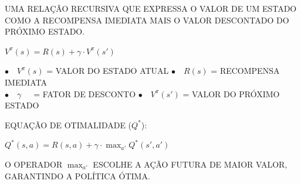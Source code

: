 \documentclass{beamer}
\begin{document}
{
\begin{frame}[plain, t]
\color{black}

\vspace{0.35cm}
\hspace{0.3cm}{\Large\bfseries\ttfamily EQUAÇÃO DE BELLMAN}

\vspace{0.35cm}
\hspace{0.3cm}
\begin{minipage}{0.92\textwidth}
{\scriptsize\ttfamily\setlength{\baselineskip}{1.5\baselineskip}
UMA RELAÇÃO RECURSIVA QUE EXPRESSA O VALOR DE UM ESTADO COMO A
RECOMPENSA IMEDIATA MAIS O VALOR DESCONTADO DO PRÓXIMO ESTADO.
}
\end{minipage}

\vspace{0.25cm}
\centering

{\normalsize\ttfamily\bfseries $V^\pi(s) = R(s) + \gamma \cdot V^\pi(s')$}

\vspace{0.20cm}

\begin{minipage}{0.80\textwidth}
{\scriptsize\ttfamily\setlength{\baselineskip}{1.8\baselineskip}
$\bullet$\ \ $V^\pi(s)$ = VALOR DO ESTADO ATUAL \quad
$\bullet$\ \ $R(s)$ = RECOMPENSA IMEDIATA\\
$\bullet$\ \ $\gamma$\ \ \ = FATOR DE DESCONTO \qquad\quad
$\bullet$\ \ $V^\pi(s')$ = VALOR DO PRÓXIMO ESTADO
}
\end{minipage}

\vspace{0.30cm}

\hspace{0.3cm}
\begin{minipage}{0.92\textwidth}
{\scriptsize\ttfamily EQUAÇÃO DE OTIMALIDADE ($Q^*$):}
\end{minipage}

\vspace{0.15cm}
\centering

{\normalsize\ttfamily\bfseries $Q^*(s,a) = R(s,a) + \gamma \cdot \boxed{\max_{a'}} Q^*(s',a')$}

\vspace{0.15cm}

\begin{minipage}{0.80\textwidth}
{\scriptsize\ttfamily\setlength{\baselineskip}{1.5\baselineskip}
O OPERADOR $\boxed{\max_{a'}}$ ESCOLHE A AÇÃO FUTURA DE MAIOR VALOR,
GARANTINDO A POLÍTICA ÓTIMA.
}
\end{minipage}

\end{frame}
}
\end{document}
